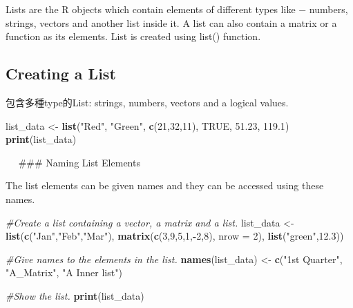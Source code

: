 \documentclass[]{book}
\newenvironment{Shaded}{\begin{snugshade}}{\end{snugshade}}
\newcommand{\CommentTok}[1]{\textcolor[rgb]{0.56,0.35,0.01}{\textit{#1}}}
\newcommand{\DataTypeTok}[1]{\textcolor[rgb]{0.13,0.29,0.53}{#1}}
\newcommand{\DecValTok}[1]{\textcolor[rgb]{0.00,0.00,0.81}{#1}}
\newcommand{\FloatTok}[1]{\textcolor[rgb]{0.00,0.00,0.81}{#1}}
\newcommand{\KeywordTok}[1]{\textcolor[rgb]{0.13,0.29,0.53}{\textbf{#1}}}
\newcommand{\NormalTok}[1]{#1}
\newcommand{\OperatorTok}[1]{\textcolor[rgb]{0.81,0.36,0.00}{\textbf{#1}}}
\newcommand{\OtherTok}[1]{\textcolor[rgb]{0.56,0.35,0.01}{#1}}
\newcommand{\StringTok}[1]{\textcolor[rgb]{0.31,0.60,0.02}{#1}}
\theoremstyle{definition}
\theoremstyle{definition}
\theoremstyle{definition}
\theoremstyle{remark}
\begin{document}
Lists are the R objects which contain elements of different types like −
numbers, strings, vectors and another list inside it. A list can also
contain a matrix or a function as its elements. List is created using
list() function.

\hypertarget{creating-a-list}{%
\subsection{Creating a List}\label{creating-a-list}}

包含多種type的List: strings, numbers, vectors and a logical values.

\begin{Shaded}
\begin{Highlighting}[]
\NormalTok{list_data <-}\StringTok{ }\KeywordTok{list}\NormalTok{(}\StringTok{"Red"}\NormalTok{, }\StringTok{"Green"}\NormalTok{, }\KeywordTok{c}\NormalTok{(}\DecValTok{21}\NormalTok{,}\DecValTok{32}\NormalTok{,}\DecValTok{11}\NormalTok{), }\OtherTok{TRUE}\NormalTok{, }\FloatTok{51.23}\NormalTok{, }\FloatTok{119.1}\NormalTok{)}
\KeywordTok{print}\NormalTok{(list_data)}
\end{Highlighting}
\end{Shaded}

　 \#\#\# Naming List Elements

The list elements can be given names and they can be accessed using
these names.

\begin{Shaded}
\begin{Highlighting}[]
\CommentTok{#Create a list containing a vector, a matrix and a list.}
\NormalTok{list_data <-}\StringTok{ }\KeywordTok{list}\NormalTok{(}\KeywordTok{c}\NormalTok{(}\StringTok{"Jan"}\NormalTok{,}\StringTok{"Feb"}\NormalTok{,}\StringTok{"Mar"}\NormalTok{), }\KeywordTok{matrix}\NormalTok{(}\KeywordTok{c}\NormalTok{(}\DecValTok{3}\NormalTok{,}\DecValTok{9}\NormalTok{,}\DecValTok{5}\NormalTok{,}\DecValTok{1}\NormalTok{,}\OperatorTok{-}\DecValTok{2}\NormalTok{,}\DecValTok{8}\NormalTok{), }\DataTypeTok{nrow =} \DecValTok{2}\NormalTok{),}
   \KeywordTok{list}\NormalTok{(}\StringTok{"green"}\NormalTok{,}\FloatTok{12.3}\NormalTok{))}

\CommentTok{#Give names to the elements in the list.}
\KeywordTok{names}\NormalTok{(list_data) <-}\StringTok{ }\KeywordTok{c}\NormalTok{(}\StringTok{"1st Quarter"}\NormalTok{, }\StringTok{"A_Matrix"}\NormalTok{, }\StringTok{"A Inner list"}\NormalTok{)}

\CommentTok{#Show the list.}
\KeywordTok{print}\NormalTok{(list_data)}
\end{Highlighting}
\end{Shaded}
\end{document}
